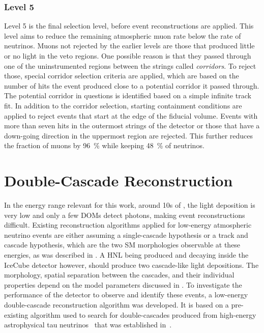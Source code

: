 \subsubsection{Level 5} 

Level 5 is the final selection level, before event reconstructions are applied. This level aims to reduce the remaining atmospheric muon rate below the rate of neutrinos. Muons not rejected by the earlier levels are those that produced little or no light in the veto regions. One possible reason is that they passed through one of the uninstrumented regions between the strings called \textit{corridors}. To reject those, special corridor selection criteria are applied, which are based on the number of hits the event produced close to a potential corridor it passed through. The potential corridor in questions is identified based on a simple infinite track fit. In addition to the corridor selection, starting containment conditions are applied to reject events that start at the edge of the fiducial volume. Events with more than seven hits in the outermost strings of the detector or those that have a down-going direction in the uppermost region are rejected. This further reduces the fraction of muons by \SI{96}{\percent} while keeping \SI{48}{\percent} of neutrinos.


\section{Double-Cascade Reconstruction} 

In the energy range relevant for this work, around 10s of \si{\gev}, the light deposition is very low and only a few DOMs detect photons, making event reconstructions difficult. Existing reconstruction algorithms applied for low-energy atmospheric neutrino events are either assuming a single-cascade hypothesis or a track and cascade hypothesis, which are the two SM morphologies observable at these energies, as was described in . A HNL being produced and decaying inside the IceCube detector however, should produce two cascade-like light depositions. The morphology, spatial separation between the cascades, and their individual properties depend on the model parameters discussed in . To investigate the performance of the detector to observe and identify these events, a low-energy double-cascade reconstruction algorithm was developed. It is based on a pre-existing algorithm used to search for double-cascades produced from high-energy astrophysical tau neutrinos~ that was established in~.


